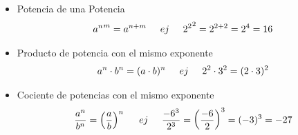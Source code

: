 \documentclass{article}
\begin{document}
\begin{itemize}
	\item{Potencia de una Potencia}
	\begin{equation*}
		{a^n}^m = a^{n+m} \hspace{0.5cm}ej\hspace{0.5cm} {2^2}^2 = 2^{2+2} = 2^4 = 16
	\end{equation*}
	\item{Producto de potencia con el mismo exponente}
	\begin{equation*}
		a^n\cdot b^n = (a\cdot b)^n \hspace{0.5cm}ej\hspace{0.5cm} 2^2 \cdot 3^2 = (2 \cdot 3)^2
	\end{equation*}
	\item{Cociente de potencias con el mismo exponente}
	\begin{equation*}
		\frac{a^n}{b^n} = \left(\frac{a}{b} \right)^n \hspace{0.5cm}ej\hspace{0.5cm} \frac{-6^3}{2^3} = \left( \frac{-6}{2} \right)^3 = (-3)^3 = -27
	\end{equation*}
\end{itemize}
	 \pagebreak
\end{document}
